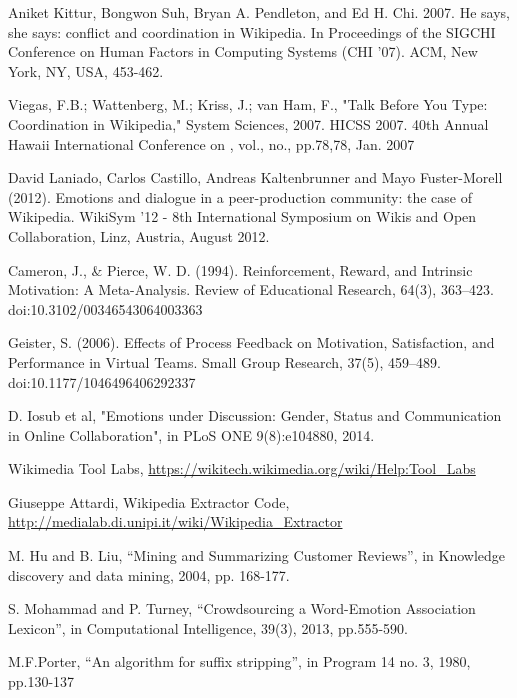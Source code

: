 \documentclass[letterpaper, 10 pt, conference]{ieeeconf}  %
\begin{document}



\begin{thebibliography}{99}

 Aniket Kittur, Bongwon Suh, Bryan A. Pendleton, and Ed H. Chi. 2007. He says, she says: conflict and coordination in Wikipedia. In Proceedings of the SIGCHI Conference on Human Factors in Computing Systems (CHI '07). ACM, New York, NY, USA, 453-462.

 Viegas, F.B.; Wattenberg, M.; Kriss, J.; van Ham, F., "Talk Before You Type: Coordination in Wikipedia," System Sciences, 2007. HICSS 2007. 40th Annual Hawaii International Conference on , vol., no., pp.78,78, Jan. 2007

 David Laniado, Carlos Castillo, Andreas Kaltenbrunner and Mayo Fuster-Morell (2012). Emotions and dialogue in a peer-production community: the case of Wikipedia. WikiSym '12 - 8th International Symposium on Wikis and Open Collaboration, Linz, Austria, August 2012.

 Cameron, J., \& Pierce, W. D. (1994). Reinforcement, Reward, and Intrinsic Motivation: A Meta-Analysis. Review of Educational Research, 64(3), 363–423. doi:10.3102/00346543064003363

 Geister, S. (2006). Effects of Process Feedback on Motivation, Satisfaction, and Performance in Virtual Teams. Small Group Research, 37(5), 459–489. doi:10.1177/1046496406292337

 D. Iosub et al, "Emotions under Discussion: Gender, Status and Communication in Online Collaboration", in PLoS ONE 9(8):e104880, 2014.

 Wikimedia Tool Labs, \url{https://wikitech.wikimedia.org/wiki/Help:Tool_Labs}

 Giuseppe Attardi, Wikipedia Extractor Code, \url{http://medialab.di.unipi.it/wiki/Wikipedia_Extractor}

 M. Hu and B. Liu, “Mining and Summarizing Customer Reviews”, in Knowledge discovery and data mining, 2004, pp. 168-177. 

 S. Mohammad and P. Turney, “Crowdsourcing a Word-Emotion Association Lexicon”, in Computational Intelligence, 39(3), 2013, pp.555-590.

 M.F.Porter, “An algorithm for suffix stripping”, in Program 14 no. 3, 1980, pp.130-137






\end{thebibliography}
\end{document}
